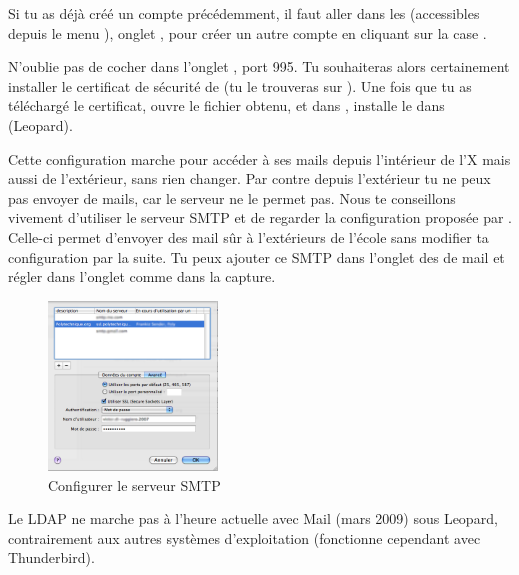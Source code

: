 Si tu as déjà créé un compte précédemment, il faut aller dans les  (accessibles depuis le menu ), onglet , pour créer un autre compte en cliquant sur la case \menu{+}.

N'oublie pas de cocher  dans l'onglet , port 995. Tu souhaiteras alors certainement installer le certificat de sécurité de  (tu le trouveras sur ). Une fois que tu as téléchargé le certificat, ouvre le fichier  obtenu, et dans , installe le dans %
 (Leopard).

Cette configuration marche pour accéder à ses mails depuis l'intérieur de l'X mais aussi de l'extérieur, sans rien changer. Par contre depuis l'extérieur tu ne peux pas envoyer de mails, car le serveur  ne le permet pas. Nous te conseillons vivement d'utiliser le serveur SMTP  et de regarder la configuration proposée par . Celle-ci permet d'envoyer des mail sûr à l'extérieurs de l'école sans modifier ta configuration par la suite. Tu peux ajouter ce SMTP dans l'onglet  des  de mail et régler dans l'onglet  comme dans la capture.

\begin{figure}[!hl]
    \begin{center}

	      \includegraphics[width=0.4\textwidth]{images/mac_config_smtp_poltechnique.png} 
      \caption{Configurer le serveur SMTP }
    \end{center}
  \end{figure}



Le LDAP ne marche pas à l'heure actuelle avec Mail (mars 2009) sous Leopard, contrairement aux  autres systèmes d'exploitation (fonctionne cependant avec Thunderbird).

